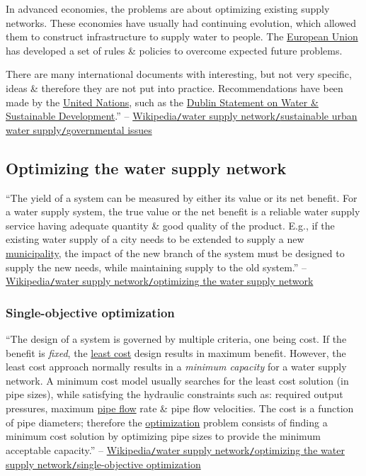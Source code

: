 \documentclass[oneside]{book}
\numberwithin{equation}{section}
\begin{document}
In advanced economies, the problems are about optimizing existing supply networks. These economies have usually had continuing evolution, which allowed them to construct infrastructure to supply water to people. The \href{https://en.wikipedia.org/wiki/European_Union}{European Union} has developed a set of rules \& policies to overcome expected future problems.

There are many international documents with interesting, but not very specific, ideas \& therefore they are not put into practice. Recommendations have been made by the \href{https://en.wikipedia.org/wiki/United_Nations}{United Nations}, such as the \href{https://en.wikipedia.org/wiki/Dublin_Statement}{Dublin Statement on Water \& Sustainable Development}.'' -- \href{https://en.wikipedia.org/wiki/Water_supply_network#Governmental_issues}{Wikipedia\texttt{/}water supply network\texttt{/}sustainable urban water supply\texttt{/}governmental issues}

\subsection{Optimizing the water supply network}
``The yield of a system can be measured by either its value or its net benefit. For a water supply system, the true value or the net benefit is a reliable water supply service having adequate quantity \& good quality of the product. E.g., if the existing water supply of a city needs to be extended to supply a new \href{https://en.wikipedia.org/wiki/Municipality}{municipality}, the impact of the new branch of the system must be designed to supply the new needs, while maintaining supply to the old system.'' -- \href{https://en.wikipedia.org/wiki/Water_supply_network#Optimizing_the_water_supply_network}{Wikipedia\texttt{/}water supply network\texttt{/}optimizing the water supply network}

\subsubsection{Single-objective optimization}
``The design of a system is governed by multiple criteria, one being cost. If the benefit is \textit{fixed}, the \href{https://en.wikipedia.org/wiki/Least-cost_routing}{least cost} design results in maximum benefit. However, the least cost approach normally results in a \textit{minimum capacity} for a water supply network. A minimum cost model usually searches for the least cost solution (in pipe sizes), while satisfying the hydraulic constraints such as: required output pressures, maximum \href{https://en.wikipedia.org/wiki/Pipe_flow}{pipe flow} rate \& pipe flow velocities. The cost is a function of pipe diameters; therefore the \href{https://en.wikipedia.org/wiki/Process_optimization}{optimization} problem consists of finding a minimum cost solution by optimizing pipe sizes to provide the minimum acceptable capacity.'' -- \href{https://en.wikipedia.org/wiki/Water_supply_network#Single-objective_optimization}{Wikipedia\texttt{/}water supply network\texttt{/}optimizing the water supply network\texttt{/}single-objective optimization} 
\end{document}
